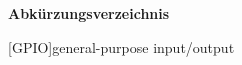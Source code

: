 \Huge\bf Abkürzungsverzeichnis \\
\normalsize\rm

\begin{acronym}

[GPIO]{general-purpose input/output}
    
\end{acronym}

\newpage
